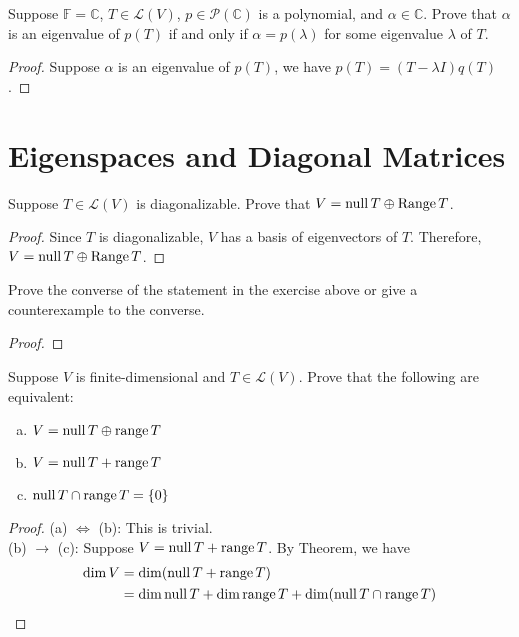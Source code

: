 \begin{exercise}
Suppose $\mathbb{F} = \mathbb{C}$, $T \in \mathcal{L}(V)$, $p \in \mathcal{P}(\mathbb{C})$ is a polynomial, and $\alpha \in \mathbb{C}$. Prove that $\alpha$ is an eigenvalue of $p(T)$ if and only if $\alpha = p(\lambda)$ for some eigenvalue $\lambda$ of $T$.
\end{exercise}
\begin{proof}
	Suppose $\alpha$ is an eigenvalue of $p(T)$,
	we have $p(T) = (T-\lambda I)q(T)$.
\end{proof}

\section{Eigenspaces and Diagonal Matrices}

\begin{exercise}
Suppose $T \in \mathcal{L}(V)$ is diagonalizable. Prove that $V = \mathop{\mathrm{null}} T \oplus \operatorname{Range} T$.
\end{exercise}
\begin{proof}
	Since $T$ is diagonalizable, $V$ has a basis of eigenvectors of $T$.
	Therefore, $V = \mathop{\mathrm{null}} T \oplus \operatorname{Range} T$.
\end{proof}

\begin{exercise}
Prove the converse of the statement in the exercise above
or give a counterexample to the converse.
\end{exercise}

\begin{proof}
\end{proof}

\begin{exercise}
Suppose $V$ is finite-dimensional and $T \in \mathcal{L}(V)$.
Prove that the following are equivalent:
\begin{enumerate}[(a)]
	\item $V = \mathop{\mathrm{null}} T \oplus \mathop{\mathrm{range}} T$
	\item $V = \mathop{\mathrm{null}} T + \mathop{\mathrm{range}} T$
	\item $\mathop{\mathrm{null}} T \cap \mathop{\mathrm{range}} T = \{0\}$
\end{enumerate}
\end{exercise}
\begin{proof}
	(a) $\iff$ (b): This is trivial. \\
	(b) $\to$ (c): Suppose $V = \mathop{\mathrm{null}} T + \mathop{\mathrm{range}} T$. By Theorem, we have
	\begin{align*}
		\dim V & = \dim (\mathop{\mathrm{null}} T + \mathop{\mathrm{range}} T)                                     \\
		       & = \dim \mathop{\mathrm{null}} T + \dim \mathop{\mathrm{range}} T + \dim ( \mathop{\mathrm{null}} T \cap \mathop{\mathrm{range}} T )
	\end{align*}
\end{proof}

